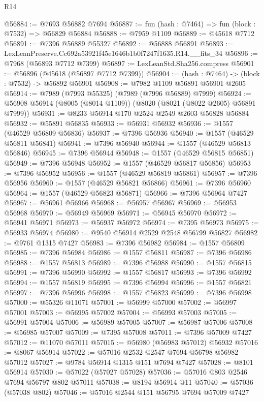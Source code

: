 \begin{lexlean}{R14}
\begin{coremodule}
@56884 := @7693 @56882 @7694
@56887 := fun (hash : @7464) => fun (block : @7532) => @56829 @56884
@56888 := @7959 @1109
@56889 := @45618 @7712
@56891 := @7396 @56889 @55327
@56892 := @56888 @56891
@56893 := LexLeanPreserve.Cc692a53921f45e1646b1b0f7247f1635.R14.__fits_34
@56896 := @7968 (@56893 @7712 @7399)
@56897 := LexLeanStd.Sha256.compress
@56901 := @56896 (@45618 (@56897 @7712 @7399))
@56904 := (hash : @7464) -> (block : @7532) -> @56892 @56901
@56908 := @7982 @1109 @56891 @56901 @2605
@56914 := @7989 (@7993 @55325) (@7989 (@7996 @56889) @7999)
@56924 := @56908 @56914 (@8005 (@8014 @1109)) (@8020 (@8021 (@8022 @2605) @56891 @7999))
@56931 := @8233 @56914 @170 @2524 @2549 @2603 @56828 @56884
@56932 := @55891 @56835
@56933 := @56931 @56932
@56936 := @1557 (@46529 @56809 @56836)
@56937 := @7396 @56936
@56940 := @1557 (@46529 @56811 @56841)
@56941 := @7396 @56940
@56944 := @1557 (@46529 @56813 @56846)
@56945 := @7396 @56944
@56948 := @1557 (@46529 @56815 @56851)
@56949 := @7396 @56948
@56952 := @1557 (@46529 @56817 @56856)
@56953 := @7396 @56952
@56956 := @1557 (@46529 @56819 @56861)
@56957 := @7396 @56956
@56960 := @1557 (@46529 @56821 @56866)
@56961 := @7396 @56960
@56964 := @1557 (@46529 @56823 @56871)
@56966 := @7396 @56964 @7427
@56967 := @56961 @56966
@56968 := @56957 @56967
@56969 := @56953 @56968
@56970 := @56949 @56969
@56971 := @56945 @56970
@56972 := @56941 @56971
@56973 := @56937 @56972
@56974 := @7395 @56973
@56975 := @56933 @56974
@56980 := @9540 @56914 @2529 @2548 @56799 @56827
@56982 := @9761 @1315 @7427
@56983 := @7396 @56982
@56984 := @1557 @56809
@56985 := @7396 @56984
@56986 := @1557 @56811
@56987 := @7396 @56986
@56988 := @1557 @56813
@56989 := @7396 @56988
@56990 := @1557 @56815
@56991 := @7396 @56990
@56992 := @1557 @56817
@56993 := @7396 @56992
@56994 := @1557 @56819
@56995 := @7396 @56994
@56996 := @1557 @56821
@56997 := @7396 @56996
@56998 := @1557 @56823
@56999 := @7396 @56998
@57000 := @55326 @11071
@57001 := @56999 @57000
@57002 := @56997 @57001
@57003 := @56995 @57002
@57004 := @56993 @57003
@57005 := @56991 @57004
@57006 := @56989 @57005
@57007 := @56987 @57006
@57008 := @56985 @57007
@57009 := @7395 @57008
@57011 := @7396 @57009 @7427
@57012 := @11070 @57011
@57015 := @56980 (@56983 @57012) @56932
@57016 := @8067 @56914
@57022 := @57016 @2532 @2547 @7694 @56798 @56982 @57012
@57027 := @9784 @56914 @1315 @151 @7694 @7427
@57028 := @8101 @56914
@57030 := @57022 (@57027 @57028)
@57036 := @57016 @803 @2546 @7694 @56797 @802 @57011
@57038 := @8194 @56914 @11
@57040 := @57036 (@57038 @802)
@57046 := @57016 @2544 @151 @56795 @7694 @57009 @7427

\end{coremodule}
\end{lexlean}
